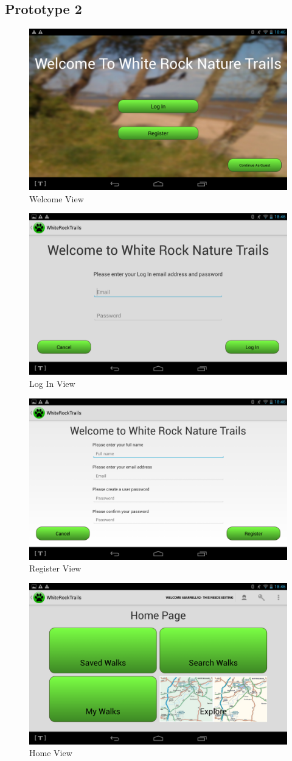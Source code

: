 \documentclass[11pt,a4paper]{article}
\begin{document}
\begin{appendices}
\newpage

\section{Prototype 2}
\label{sec:appendPro2}


\begin{figure}[H]
\centering
\includegraphics[width=0.6\linewidth]{./img/welcome}
\caption{Welcome View}
\end{figure}

\begin{figure}[H]
\centering
\includegraphics[width=0.6\linewidth]{./img/log_in}
\caption{Log In View}
\end{figure}

\begin{figure}[H]
\centering
\includegraphics[width=0.6\linewidth]{./img/register}
\caption{Register View}
\end{figure}

\begin{figure}[H]
\centering
\includegraphics[width=0.6\linewidth]{./img/home}
\caption{Home View}
\end{figure}


\end{appendices}
\end{document}
